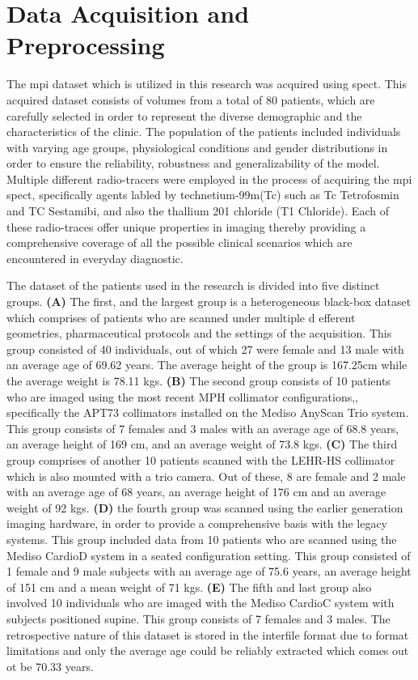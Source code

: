 \section{Data Acquisition and Preprocessing}

The \gls{mpi} dataset which is utilized in this research was acquired using \gls{spect}. This acquired dataset consists of volumes from a total of 80 patients, which are carefully selected in order to represent the diverse demographic and the characteristics of the clinic. The population of the patients included individuals with varying age groups, physiological conditions and gender distributions in order to ensure the reliability, robustness and generalizability of the model. Multiple different radio-tracers were employed in the process of acquiring the \gls{mpi} \gls{spect}, specifically agents labled by technetium-99m(Tc) such as Tc Tetrofosmin and TC Sestamibi, and also the thallium 201 chloride (T1 Chloride). Each of these radio-traces offer unique properties in imaging thereby providing a comprehensive coverage of all the possible clinical scenarios which are encountered in everyday diagnostic. 

The dataset of the patients used in the research is divided into five distinct groups. \textbf{(A)} The first, and the largest group is a heterogeneous black-box dataset which comprises of patients who are scanned under multiple d efferent geometries, pharmaceutical protocols and the settings of the acquisition. This group consisted of 40 individuals, out of which 27 were female and 13 male with an average age of 69.62 years. The average height of the group is 167.25cm while the average weight is 78.11 kgs. \textbf{(B)} The second group consists of 10 patients who are imaged using the most recent MPH collimator configurations,, specifically the APT73 collimators installed on the Mediso AnyScan Trio system. This group consists of 7 females and 3 males with an average age of 68.8 years, an average height of 169 cm, and an average weight of 73.8 kgs. \textbf{(C)} The third group comprises of another 10 patients scanned with the LEHR-HS collimator which is also mounted with a trio camera. Out of these, 8 are female and 2 male with an average age of 68 years, an average height of 176 cm and an average weight of 92 kgs. \textbf{(D)} the fourth group was scanned using the earlier generation imaging hardware, in order to provide a comprehensive basis with the legacy systems. This group included data from 10 patients who are scanned using the Mediso CardioD system in a seated configuration setting. This group consisted of 1 female and 9 male subjects with an average age of 75.6 years, an average height of 151 cm and a mean weight of 71 kgs. \textbf{(E)} The fifth and last group also involved 10 individuals who are imaged with the Mediso CardioC system with subjects positioned supine. This group consists of 7 females and 3 males. The retrospective nature of this dataset is stored in the interfile format due to format limitations and only the average age could be reliably extracted which comes out ot be 70.33 years.

